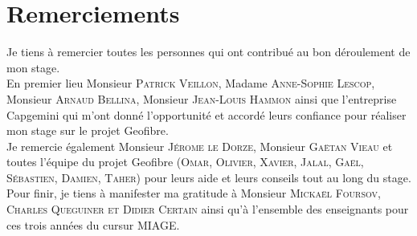 \chapter*{Remerciements}
\begin{flushright}
Je tiens à remercier toutes les personnes qui ont contribué au bon déroulement de mon stage.
\\[1cm]En premier lieu Monsieur \textsc{Patrick Veillon}, Madame \textsc{Anne-Sophie Lescop}, Monsieur \textsc{Arnaud Bellina}, Monsieur \textsc{Jean-Louis Hammon} ainsi que l'entreprise Capgemini
qui m'ont donné l'opportunité et accordé leurs confiance pour réaliser mon stage sur le projet Geofibre.
\\[1cm]Je remercie également Monsieur \textsc{Jérome le Dorze}, Monsieur \textsc{Gaëtan Vieau} et toutes l'équipe du projet Geofibre (\textsc{Omar, Olivier, Xavier, Jalal, Gaël, Sébastien, Damien, Taher}) pour leurs aide et leurs conseils tout au long du stage.
\\[1cm]Pour finir, je tiens à manifester ma gratitude à Monsieur \textsc{Mickaël Foursov, Charles Queguiner et Didier Certain} ainsi qu'à l'ensemble des enseignants pour ces trois années du cursur MIAGE.
\end{flushright}
